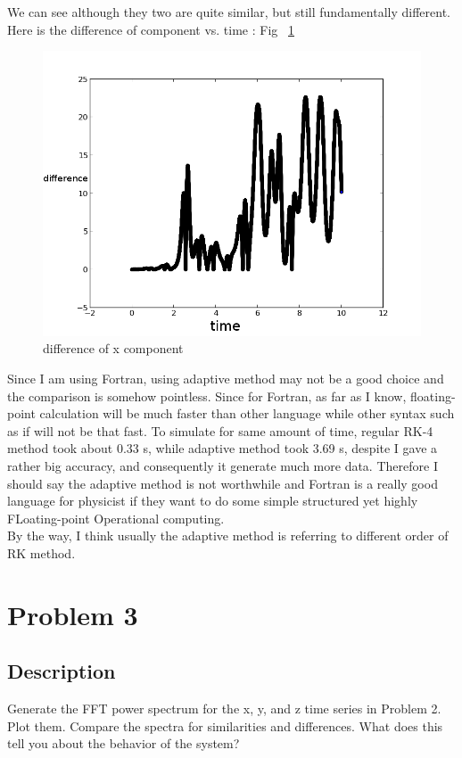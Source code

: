 \documentclass[11pt,letterpaper]{article}
\begin{document}
We can see although they two are quite similar, but still fundamentally different. Here is the difference of component vs. time : Fig ~\ref{figure4}

\begin{figure}
\begin{center}
\includegraphics[width=0.8\linewidth,angle=0]{butterflydiff.png}
\caption{difference of x component}
\label{figure4}
\end{center}
\end{figure}

Since I am using Fortran, using adaptive method may not be a good choice and the comparison is somehow pointless. Since for Fortran, as far as I know, floating-point calculation will be much faster than other language while other syntax such as if will not be that fast. To simulate for same amount of time, regular RK-4 method took about 0.33 s, while adaptive method took 3.69 s, despite I gave a rather big accuracy, and consequently it generate much more data. Therefore I should say the adaptive method is not worthwhile and Fortran is a really good language for physicist if they want to do some simple structured yet highly FLoating-point Operational computing.\\
By the way, I think usually the adaptive method is referring to different order of RK method.


\newpage

\section{Problem 3}
\subsection{Description}
Generate the FFT power spectrum for the x, y, and z time series in Problem 2. Plot them. Compare the spectra for similarities and differences. What does this tell you about the behavior of the system? 
\end{document}
